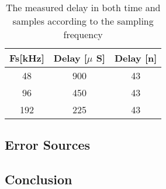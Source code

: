 \begin{table}[H]
	\centering
	\begin{tabular}{ccc}
		Fs[kHz] & Delay [$\mu$ S] & Delay [n] \\ \hline \hline
		48 & 900 & 43 \\ 
		96 & 450 & 43 \\ 
		192 & 225 & 43
	\end{tabular} 
	\caption{The measured delay in both time and samples according to the sampling frequency}
	\label{tab:DelayResults}
\end{table}





\subsection{Error Sources}

\subsection{Conclusion}
